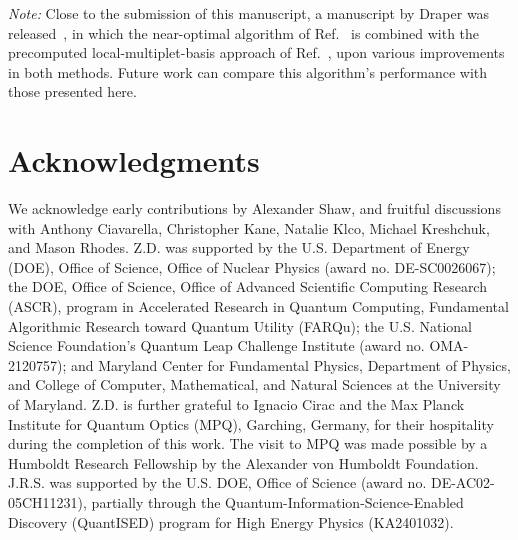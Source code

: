 \documentclass[aps,prd,twocolumn,showpacs,groupedaddress,superscriptaddress,nofootinbib,floatfix,preprintnumbers,longbibliography]{revtex4-1}
\begin{document}
\vspace{1 cm}

\noindent
\emph{Note:} Close to the submission of this manuscript, a manuscript by Draper was released~\cite{Draper:2026bcj}, in which the near-optimal algorithm of Ref.~\cite{Rhodes:2024zbr} is combined with the precomputed local-multiplet-basis approach of Ref.~\cite{Ciavarella:2021nmj}, upon various improvements in both methods. Future work can compare this algorithm's performance with those presented here.


\section*{Acknowledgments
\label{sec:acks}
}
\noindent
We acknowledge early contributions by Alexander Shaw, and fruitful discussions with Anthony Ciavarella, Christopher Kane, Natalie Klco, Michael Kreshchuk, and Mason Rhodes. Z.D. was supported by the U.S. Department of Energy (DOE), Office of Science, Office of Nuclear Physics (award no. DE-SC0026067); the DOE, Office of Science, Office of Advanced Scientific Computing Research (ASCR), program in Accelerated Research in Quantum Computing, Fundamental Algorithmic Research toward Quantum Utility (FARQu); the U.S. National Science Foundation’s Quantum Leap Challenge Institute (award no. OMA-2120757); and Maryland Center for Fundamental Physics, Department of Physics, and College of Computer, Mathematical, and Natural Sciences at the University of Maryland. Z.D. is further grateful to Ignacio Cirac and the Max Planck Institute for Quantum Optics (MPQ), Garching, Germany, for their hospitality during the completion of this work. The visit to MPQ was made possible by a Humboldt Research Fellowship by the Alexander von Humboldt Foundation. J.R.S. was supported by the U.S. DOE, Office of Science (award no. DE-AC02-05CH11231), partially through the Quantum-Information-Science-Enabled Discovery (QuantISED) program for High Energy Physics (KA2401032). 


\end{document}
